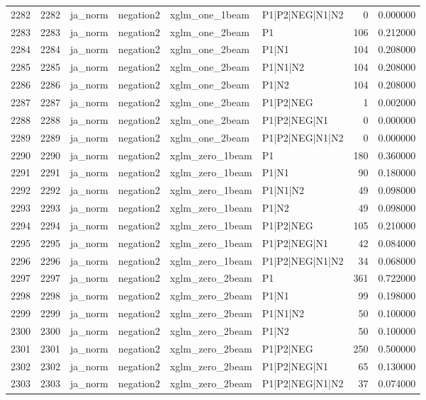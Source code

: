 \begin{tabular}{lrllllrr}
2282 & 2282 & ja_norm & negation2 & xglm_one_1beam & P1|P2|NEG|N1|N2 & 0 & 0.000000 \\
2283 & 2283 & ja_norm & negation2 & xglm_one_2beam & P1 & 106 & 0.212000 \\
2284 & 2284 & ja_norm & negation2 & xglm_one_2beam & P1|N1 & 104 & 0.208000 \\
2285 & 2285 & ja_norm & negation2 & xglm_one_2beam & P1|N1|N2 & 104 & 0.208000 \\
2286 & 2286 & ja_norm & negation2 & xglm_one_2beam & P1|N2 & 104 & 0.208000 \\
2287 & 2287 & ja_norm & negation2 & xglm_one_2beam & P1|P2|NEG & 1 & 0.002000 \\
2288 & 2288 & ja_norm & negation2 & xglm_one_2beam & P1|P2|NEG|N1 & 0 & 0.000000 \\
2289 & 2289 & ja_norm & negation2 & xglm_one_2beam & P1|P2|NEG|N1|N2 & 0 & 0.000000 \\
2290 & 2290 & ja_norm & negation2 & xglm_zero_1beam & P1 & 180 & 0.360000 \\
2291 & 2291 & ja_norm & negation2 & xglm_zero_1beam & P1|N1 & 90 & 0.180000 \\
2292 & 2292 & ja_norm & negation2 & xglm_zero_1beam & P1|N1|N2 & 49 & 0.098000 \\
2293 & 2293 & ja_norm & negation2 & xglm_zero_1beam & P1|N2 & 49 & 0.098000 \\
2294 & 2294 & ja_norm & negation2 & xglm_zero_1beam & P1|P2|NEG & 105 & 0.210000 \\
2295 & 2295 & ja_norm & negation2 & xglm_zero_1beam & P1|P2|NEG|N1 & 42 & 0.084000 \\
2296 & 2296 & ja_norm & negation2 & xglm_zero_1beam & P1|P2|NEG|N1|N2 & 34 & 0.068000 \\
2297 & 2297 & ja_norm & negation2 & xglm_zero_2beam & P1 & 361 & 0.722000 \\
2298 & 2298 & ja_norm & negation2 & xglm_zero_2beam & P1|N1 & 99 & 0.198000 \\
2299 & 2299 & ja_norm & negation2 & xglm_zero_2beam & P1|N1|N2 & 50 & 0.100000 \\
2300 & 2300 & ja_norm & negation2 & xglm_zero_2beam & P1|N2 & 50 & 0.100000 \\
2301 & 2301 & ja_norm & negation2 & xglm_zero_2beam & P1|P2|NEG & 250 & 0.500000 \\
2302 & 2302 & ja_norm & negation2 & xglm_zero_2beam & P1|P2|NEG|N1 & 65 & 0.130000 \\
2303 & 2303 & ja_norm & negation2 & xglm_zero_2beam & P1|P2|NEG|N1|N2 & 37 & 0.074000 \\

\end{tabular}
